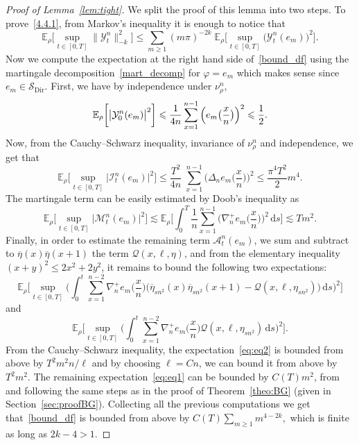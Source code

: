 \documentclass[10pt]{amsart}
\theoremstyle{definition}\newtheorem{defi}[theo]{Definition}\newtheorem{rema}[theo]{Remark}\newtheorem{exam}[theo]{Example}\newtheorem{exem}[theo]{Example}\newtheorem{nota}[theo]{Notation}
\DeclareMathOperator{\Dir}{Dir}
\newcommand{\mc}[1]{{\mathcal #1}}
\renewcommand{\mc}[1]{{\mathcal #1}}
\newcommand{\SD}{\ensuremath{\mc S_{\Dir}}}
\newcommand{\pfrac}[2]{\genfrac{}{}{}{1}{#1}{#2}}
\renewcommand{\bar}{\overline}
\renewcommand{\leq}{\leqslant}
\renewcommand{\le}{\leqslant}
\renewcommand{\geq}{\geqslant}
\newcommand*{\dd}{\mathrm{d}}
\newcommand*{\ds}{\dd s}
\renewcommand{\pfrac}{\frac}
\begin{document}
\begin{proof}[Proof of Lemma~\ref{lem:tight}]
We split the proof of this lemma into two steps. To prove~\eqref{4.4.1}, from Markov's inequality it is enough to notice that
\begin{equation}\label{bound_df}
\mathbb{E}_{\rho}\bigg[\sup_{t\in[0,T]}\|{{\mathcal{Y}}}^n_{t}\|_{-k}^{2}\bigg] \le
\sum_{m\geq 1}(m\pi)^{-2k}\; \mathbb{E}_{\rho}\bigg[\sup_{t\in[0,T]}\big(\mathcal{Y}^n_{t}(e_m)\big)^{2}\bigg].
\end{equation}
Now we compute the expectation at the right hand side of~\eqref{bound_df} using the martingale decomposition~\eqref{mart_decomp} for $\varphi=e_m$ which makes sense since $e_m\in\SD$. First, we have by independence under $\nu^n_\rho$,
\begin{equation}\label{initialtime}
\mathbb{E}_{\rho}\bigg[\big|{\mathcal Y}_{0}^{n}(e_m)\big|^2\bigg]\\
\leq \frac{1}{4n}\sum_{x=1}^{n-1}\Big(e_m\big(\pfrac x n\big)\Big)^2\leq \frac 1 2.
\end{equation}
Now, from the Cauchy--Schwarz inequality, invariance of $\nu^n_\rho$ and independence, we get that
\begin{equation}\label{boundintj}
\mathbb{E}_{\rho}\bigg[\sup_{t\in[0,T]}\big|\mathcal{I}_t^n(e_m)\big|^2\bigg]
\leq
\frac{T^2}{4n}\; \sum_{x=1}^{n-1}\Big(\Delta_ne_m\Big(\pfrac x n\Big)\Big)^2\leq \frac{\pi^4T^2}{2} m^4.
\end{equation}
The martingale term can be easily estimated by Doob's inequality as
\begin{equation*}
\mathbb{E}_{\rho}\bigg[\sup_{t\in[0,T]}\big|\mathcal{M}_{t}^n(e_m)\big|^{2}\bigg]\lesssim \mathbb{E}_{\rho}\bigg[\int_0^T\frac{1}{n}\sum_{x=1}^{n-1}\Big(\nabla_n^+ e_m\Big(\pfrac x n\Big)\Big)^2\,\ds\bigg]\lesssim Tm^2.
\end{equation*}
Finally, in order to estimate the remaining term $\mc A_t^n(e_m)$, we sum and subtract to $\bar\eta(x)\bar\eta(x+1)$ the term $\mathcal {Q}(x,\ell,\eta)$, and from the elementary inequality $(x+y)^2\leq 2x^2+2y^2$, it remains to bound the following two expectations:
\begin{equation}\label{eq:eq1}
\mathbb{E}_{\rho}\bigg[\sup_{t\in[0,T]}\bigg(\int_{0}^t\sum_{x=1}^{n-2}\nabla_n^+ e_m\Big(\pfrac x n \Big)\big(\bar\eta_{sn^2}(x)\bar\eta_{sn^2}(x+1)-\mathcal{Q}(x,\ell,\eta_{sn^2})\big)\, \ds\bigg)^2\bigg]
\end{equation}
and
\begin{equation}\label{eq:eq2}
\mathbb{E}_{\rho}\bigg[\sup_{t\in[0,T]}\bigg(\int_{0}^t\sum_{x=1}^{n-2}\nabla_n^+ e_m\Big(\pfrac x n \Big)\mathcal{Q}(x,\ell,\eta_{sn^2})\, \ds
\bigg)^2\bigg].
\end{equation}
From the Cauchy--Schwarz inequality, the expectation~\eqref{eq:eq2} is bounded from above by $T^2m^2n/\ell$ and by choosing $\ell=Cn$, we can bound it from above by $T^2m^2$. The remaining expectation~\eqref{eq:eq1} can be bounded by $C(T)m^2$, from~\cite[Lemma~4.3]{CLO} and following the same steps as in the proof of Theorem~\ref{theo:BG} (given in Section~\ref{sec:proofBG}). Collecting all the previous computations we get that~\eqref{bound_df} is bounded from above by $C(T)\sum_{m\geq1}{m}^{4-2k},$ which is finite as long as $2k-4>1$.


\end{proof}
\end{document}
